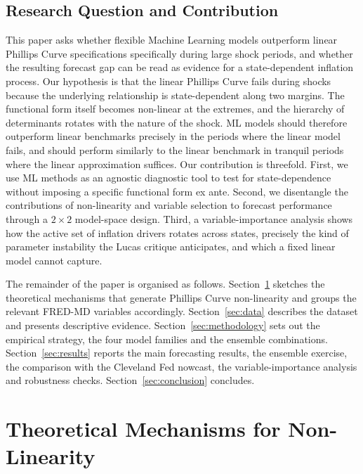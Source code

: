 \documentclass[12pt,a4paper]{article}
\begin{document}
\subsection{Research Question and Contribution}
\label{subsec:synthesis}
This paper asks whether flexible Machine Learning models outperform linear Phillips Curve specifications specifically during large shock periods, and whether the resulting forecast gap can be read as evidence for a state-dependent inflation process. Our hypothesis is that the linear Phillips Curve fails during shocks because the underlying relationship is state-dependent along two margins. The functional form itself becomes non-linear at the extremes, and the hierarchy of determinants rotates with the nature of the shock. ML models should therefore outperform linear benchmarks precisely in the periods where the linear model fails, and should perform similarly to the linear benchmark in tranquil periods where the linear approximation suffices. Our contribution is threefold. First, we use ML methods as an agnostic diagnostic tool to test for state-dependence without imposing a specific functional form ex ante. Second, we disentangle the contributions of non-linearity and variable selection to forecast performance through a $2\times2$ model-space design. Third, a variable-importance analysis shows how the active set of inflation drivers rotates across states, precisely the kind of parameter instability the Lucas critique anticipates, and which a fixed linear model cannot capture.

The remainder of the paper is organised as follows. Section~\ref{sec:theory} sketches the theoretical mechanisms that generate Phillips Curve non-linearity and groups the relevant FRED-MD variables accordingly. Section~\ref{sec:data} describes the dataset and presents descriptive evidence. Section~\ref{sec:methodology} sets out the empirical strategy, the four model families and the ensemble combinations. Section~\ref{sec:results} reports the main forecasting results, the ensemble exercise, the comparison with the Cleveland Fed nowcast, the variable-importance analysis and robustness checks. Section~\ref{sec:conclusion} concludes.

\FloatBarrier
\section{Theoretical Mechanisms for Non-Linearity}
\label{sec:theory}
\end{document}
